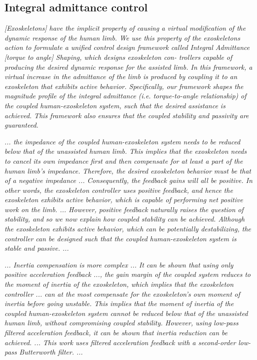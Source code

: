 \documentclass[letterpaper,12pt,fullpage]{article}
\begin{document}
\subsection{Integral admittance control}

{\it [Exoskeletons] have the implicit property
of causing a virtual modification of the dynamic response of
the human limb. We use this property of the exoskeletons
action to formulate a unified control design framework called
Integral Admittance [torque to angle] Shaping, which designs exoskeleton con-
trollers capable of producing the desired dynamic response
for the assisted limb. In this framework, a virtual increase
in the admittance of the limb is produced by coupling it
to an exoskeleton that exhibits active behavior. Specifically,
our framework shapes the magnitude profile of the integral
admittance (i.e. torque-to-angle relationship) of the coupled
human-exoskeleton system, such that the desired assistance is
achieved. This framework also ensures that the coupled stability
and passivity are guaranteed.}~\cite{Nagarajan_etal_2015}

{\it ... the impedance of the coupled human-exoskeleton
system needs to be reduced below that of the unassisted
human limb. This implies that the exoskeleton needs to
cancel its own impedance first and then compensate for
at least a part of the human limb’s impedance. Therefore,
the desired exoskeleton behavior must be that of a negative
impedance ... Consequently,
the feedback gains will all be
positive. In other words, the exoskeleton controller uses
positive feedback, and hence the exoskeleton exhibits active
behavior, which is capable of performing net positive work
on the limb. ...
However, positive feedback naturally raises the question of
stability, and so we now explain how coupled stability can be
achieved. Although the exoskeleton exhibits active behavior,
which can be potentially destabilizing, the controller can be
designed such that the coupled human-exoskeleton system
is stable and passive. ... 
}~\cite{Nagarajan_etal_2015}

{\it
... Inertia compensation is more complex ...
It can be shown that using only positive acceleration
feedback ..., the gain margin of the coupled system
reduces to the moment of inertia of the exoskeleton, which
implies that the exoskeleton controller ... can at the most
compensate for the exoskeleton’s own moment of inertia
before going unstable. This implies that the moment of
inertia of the coupled human-exoskeleton system cannot be
reduced below that of the unassisted human limb, without
compromising coupled stability. However, using low-pass
filtered acceleration feedback, it can be shown that inertia 
reduction can be achieved. ...
This work uses filtered acceleration
feedback with a second-order low-pass Butterworth filter. ...
}~\cite{Nagarajan_etal_2015}
\end{document}
